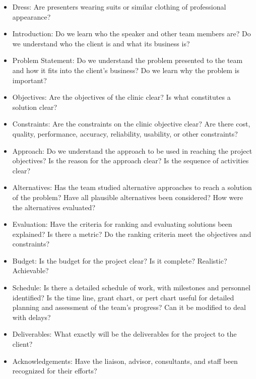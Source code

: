 \documentclass[12pt]{article}
\begin{document}
\begin{itemize}
\item Dress:  Are presenters wearing suits or similar clothing of
  professional appearance? 

\item Introduction: Do we learn who the speaker and other team members are?
Do we understand who the client is and what its business is?

\item Problem Statement:  Do we understand the problem presented to
  the team and how it fits into the client’s business? Do we learn why
  the problem is important?

\item Objectives: Are the objectives of the clinic clear? Is what
  constitutes a solution clear? 

\item Constraints: Are the constraints on the clinic objective clear?
  Are there cost, quality, performance, accuracy, reliability,
  usability, or other constraints?

\item Approach: Do we understand the approach to be used in reaching
  the project objectives? Is the reason for the approach clear? Is the
  sequence of activities clear?

\item Alternatives: Has the team studied alternative approaches to
  reach a solution of the problem? Have all plausible alternatives
  been considered? How were the alternatives evaluated?

\item Evaluation: Have the criteria for ranking and evaluating
  solutions been explained? Is there a metric? Do the ranking criteria
  meet the objectives and constraints?

\item Budget: Is the budget for the project clear? Is it complete?
  Realistic? Achievable?

\item Schedule: Is there a detailed schedule of work, with milestones
  and personnel identified? Is the time line, grant chart, or pert
  chart useful for detailed planning and assessment of the team’s
  progress? Can it be modified to deal with delays?

\item Deliverables: What exactly will be the deliverables for the
  project to the client? 

\item Acknowledgements: Have the liaison, advisor,
  consultants, and staff been recognized for their efforts?


\end{itemize}
\end{document}
